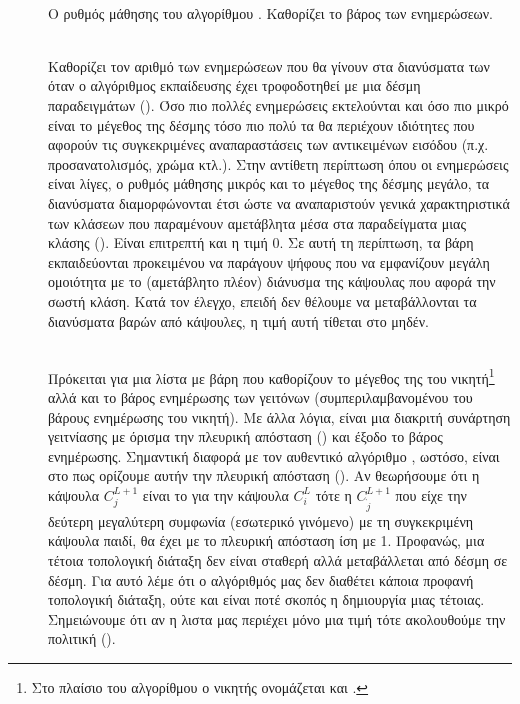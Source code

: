\begin{description}
  \item[] \hfill \\ Ο ρυθμός μάθησης του αλγορίθμου . Καθορίζει το βάρος των ενημερώσεων.
  \item[] \hfill \\ Καθορίζει τον αριθμό των ενημερώσεων που θα γίνουν στα διανύσματα των  όταν ο αλγόριθμος εκπαίδευσης έχει τροφοδοτηθεί με μια δέσμη παραδειγμάτων (). Όσο πιο πολλές ενημερώσεις εκτελούνται και όσο πιο μικρό είναι το μέγεθος της δέσμης τόσο πιο πολύ τα  θα περιέχουν ιδιότητες που αφορούν τις συγκεκριμένες αναπαραστάσεις των αντικειμένων εισόδου (π.χ. προσανατολισμός, χρώμα κτλ.). Στην αντίθετη περίπτωση όπου οι ενημερώσεις είναι λίγες, ο ρυθμός μάθησης  μικρός και το μέγεθος της δέσμης μεγάλο, τα διανύσματα  διαμορφώνονται έτσι ώστε να αναπαριστούν γενικά χαρακτηριστικά των κλάσεων που παραμένουν αμετάβλητα μέσα στα παραδείγματα μιας κλάσης (). Είναι επιτρεπτή και η τιμή 0. Σε αυτή τη περίπτωση, τα βάρη εκπαιδεύονται προκειμένου να παράγουν ψήφους που να εμφανίζουν μεγάλη ομοιότητα με το (αμετάβλητο πλέον) διάνυσμα της κάψουλας που αφορά την σωστή κλάση. Κατά τον έλεγχο, επειδή δεν θέλουμε να μεταβάλλονται τα διανύσματα βαρών από κάψουλες, η τιμή αυτή τίθεται στο μηδέν.
  
  \item[] \hfill \\ Πρόκειται για μια λίστα με βάρη που καθορίζουν το μέγεθος της  του νικητή\footnote{Στο πλαίσιο του αλγορίθμου  ο νικητής ονομάζεται και .} αλλά και το βάρος ενημέρωσης των γειτόνων (συμπεριλαμβανομένου του βάρους ενημέρωσης του νικητή). Με άλλα λόγια, είναι μια διακριτή συνάρτηση γειτνίασης με όρισμα την πλευρική απόσταση () και έξοδο το βάρος ενημέρωσης. Σημαντική διαφορά με τον αυθεντικό αλγόριθμο , ωστόσο, είναι στο πως ορίζουμε αυτήν την πλευρική απόσταση (). Αν θεωρήσουμε ότι η κάψουλα $C_j^{L+1}$ είναι το  για την κάψουλα $C_i^L$ τότε η $C^{L+1}_{\grave{j}}$ που είχε την δεύτερη μεγαλύτερη συμφωνία (εσωτερικό γινόμενο) με τη συγκεκριμένη κάψουλα παιδί, θα έχει με το  πλευρική απόσταση ίση με 1. Προφανώς, μια τέτοια τοπολογική διάταξη δεν είναι σταθερή αλλά μεταβάλλεται από δέσμη σε δέσμη. Για αυτό λέμε ότι ο αλγόριθμός μας δεν διαθέτει κάποια προφανή τοπολογική διάταξη, ούτε και είναι ποτέ σκοπός η δημιουργία μιας τέτοιας. Σημειώνουμε ότι αν η λιστα μας περιέχει μόνο μια τιμή τότε ακολουθούμε την πολιτική  ().
  

\end{description}
